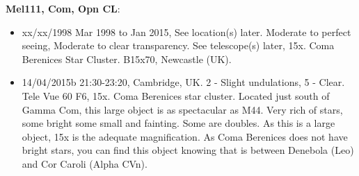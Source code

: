 {\bf Mel111, Com, Opn CL}:
\begin{itemize}
\item xx/xx/1998 Mar 1998 to Jan 2015, See location(s) later. Moderate to perfect seeing, Moderate to clear transparency. See telescope(s) later, 15x. Coma Berenices Star Cluster. B15x70, Newcastle (UK).
\item 14/04/2015b 21:30-23:20, Cambridge, UK. 2 - Slight undulations, 5 - Clear. Tele Vue 60 F6, 15x. Coma Berenices star cluster. Located just south of Gamma Com, this large object is as spectacular as M44. Very rich of stars, some bright some small and fainting. Some are doubles. As this is a large object, 15x is the adequate magnification. As Coma Berenices does not have bright stars, you can find this object knowing that is between Denebola (Leo) and Cor Caroli (Alpha CVn).
\end{itemize}
